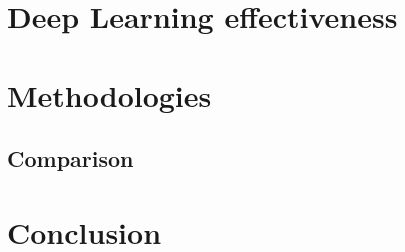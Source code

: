 \documentclass[11pt,en]{elegantpaper}
\begin{document}
\section{Deep Learning effectiveness}


\section{Methodologies}


\subsection{Comparison}


\section{Conclusion}


%
\end{document}
